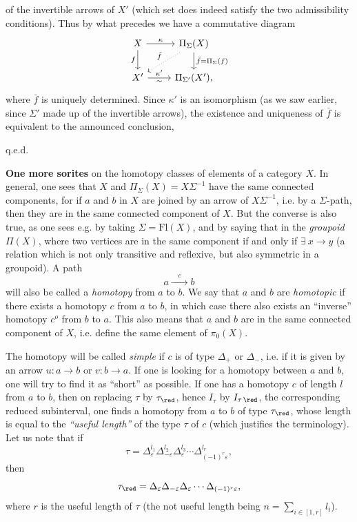 \setcounter{footnote}{20}

of the invertible arrows of $X'$ (which set does indeed satisfy the two admissibility conditions). Thus by what precedes we have a commutative diagram
\[
\begin{tikzcd}
X \ar[r,"\kappa"] \ar[d,"f"'] & \Pi_{\Sigma}(X) \ar[d,"\bar f = \Pi_{\Sigma}(f)"] \ar[dl,dotted,"\tilde f"'] \\
X' \ar[r,"\kappa'","\sim"'] & \Pi_{\Sigma'}(X'),
\end{tikzcd}
\]
where $\bar f$ is uniquely determined. Since $\kappa'$ is an isomorphism (as we saw earlier, since $\Sigma'$ made up of the invertible arrows), the existence and uniqueness of $\bar f$ is equivalent to the announced conclusion,

\hfill q.e.d.

\textbf{One more sorites} on the homotopy classes of elements of a category $X$. In general, one sees that $X$ and $\Pi_{\Sigma}(X) = X\Sigma^{-1}$ have the same connected components, for if
$a$ and $b$ in $X$ are joined by an arrow of $X\Sigma^{-1}$, i.e. by a $\Sigma$-path, then they are in the same connected component of $X$. But the converse is also true, as one sees e.g. by taking $\Sigma = \mathrm{Fl}(X)$, and by saying that in the \textit{groupoid} $\Pi(X)$, where two vertices are in the same component if and only if $\exists\ x \longrightarrow y$ (a relation which is not only transitive and reflexive, but also symmetric in a groupoid). A path
\[
a \xrightarrow{\quad c \quad} b
\]
will also be called a \textit{homotopy} from $a$ to $b$. We say that $a$ and $b$ are \textit{homotopic} if there exists a homotopy $c$ from $a$ to $b$, in which case there also exists an ``inverse'' homotopy $c^{o}$ from $b$ to $a$. This also means that $a$ and $b$ are in the same connected component of $X$, i.e. define the same element of $\pi_0(X)$.

The homotopy will be called \textit{simple} if $c$ is of type $\Delta_{+}$ or $\Delta_{-}$, i.e. if it is given by an arrow $u : a \longrightarrow b$ or $v : b \longrightarrow a$. If one is looking for a homotopy between $a$ and $b$, one will try to find it as ``short'' as possible. If one has a homotopy $c$ of length $l$ from $a$ to $b$, then on replacing $\tau$ by $\tau_{\red}$, hence $I_{\tau}$ by $I_{\tau\,\red}$, the corresponding reduced
subinterval, one finds a homotopy from $a$ to $b$ of type $\tau_{\red}$, whose length is equal to the \textit{``useful length''} of the type $\tau$ of $c$ (which justifies the terminology). Let us note that if
\[
\tau = \Delta_{\varepsilon}^{l_1}\Delta_{-\varepsilon}^{l_2}\Delta_{\varepsilon}^{l_3}\cdots\Delta_{(-1)^{r}\varepsilon}^{l_r},
\]
then
\[
\tau_{\red} = \Delta_{\varepsilon}\Delta_{-\varepsilon}\Delta_{\varepsilon}\cdots\Delta_{(-1)^{r}\varepsilon},
\]
 where $r$ is the useful length of $\tau$ (the not useful length being $n = \sum\limits_{i\in[1,r]} l_i$).

